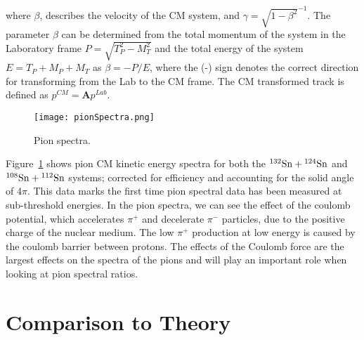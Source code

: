 where $\beta$, describes the velocity of the CM system, and $\gamma=\sqrt{1-\beta^2}^{-1}$. The parameter $\beta$ can be determined from the total momentum of the system in the Laboratory frame $P = \sqrt{ T_{P}^2 - M_{T}^2}$ and the total energy of the system $E = T_{P} + M_{P} + M_{T}$ as $\beta = -P/E$, where the (-) sign denotes the correct direction for transforming from the Lab to the CM frame. The CM transformed track is defined as $p^{CM} = \textbf{A}p^{Lab}$.

\begin{figure}[!htb]
\centering
\texttt{[image: pionSpectra.png]}
\caption{Pion spectra. }
\label{fig:pionspectra}
\end{figure}


Figure~\ref{fig:pionspectra} shows pion CM kinetic energy spectra for both the ${}^{132}\mathrm{Sn} + {}^{124}\mathrm{Sn}$ and ${}^{108}\mathrm{Sn} + {}^{112}\mathrm{Sn}$ systems; corrected for efficiency and accounting for the solid angle of 4$\pi$. This data marks the first time pion spectral data  has been measured at sub-threshold energies. In the pion spectra, we can see the effect of the coulomb potential, which accelerates $\pi^+$ and decelerate $\pi^-$ particles, due to the positive charge of the nuclear medium. The low $\pi^+$ production at low energy is caused by the coulomb barrier between protons. The effects of the Coulomb force are the largest effects on the spectra of the pions and will play an important role when looking at pion spectral ratios. 






\section{Comparison to Theory}

